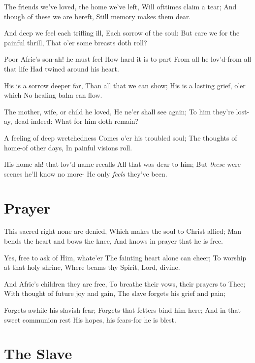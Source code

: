 \documentclass[11pt,a4paper]{article}
\begin{document}
The friends we've loved, the home we've left,
Will ofttimes claim a tear;
And though of these we are bereft,
Still memory makes them dear.

And deep we feel each trifling ill,
Each sorrow of the soul:
But care we for the painful thrill,
That o'er some breasts doth roll?

Poor Afric's son-ah! he must feel
How hard it is to part
From all he lov'd-from all that life
Had twined around his heart.

His is a sorrow deeper far,
Than all that we can show;
His is a lasting grief, o'er which
No healing balm can flow.

The mother, wife, or child he loved,
He ne'er shall see again;
To him they're lost-ay, dead indeed:
What for him doth remain?

A feeling of deep wretchedness
Comes o'er his troubled soul;
The thoughts of home-of other days,
In painful visions roll.

His home-ah! that lov'd name recalls
All that was dear to him;
But \textit{these} were scenes he'll know no more-
He only \textit{feels} they've been.

\section{Prayer}

This sacred right none are denied,
Which makes the soul to Christ allied;
Man bends the heart and bows the knee,
And knows in prayer that he is free.

Yes, free to ask of Him, whate'er
The fainting heart alone can cheer;
To worship at that holy shrine,
Where beams thy Spirit, Lord, divine.

And Afric's children they are free,
To breathe their vows, their prayers to Thee;
With thought of future joy and gain,
The slave forgets his grief and pain;

Forgets awhile his slavish fear;
Forgets-that fetters bind him here;
And in that sweet communion rest
His hopes, his fears-for he is blest.

\section{The Slave}
\end{document}
